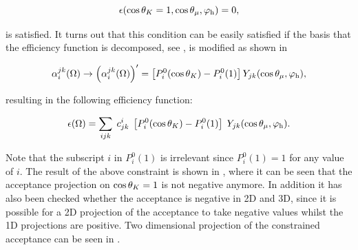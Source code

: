\begin{equation}
  \centering
  \epsilon(\cos\thetaK = 1, \cos\thetamu, \phihel) = 0,
  \label{eff_func_constr}
\end{equation}

\noindent is satisfied. It turns out that this condition can be easily satisfied if the basis that the
efficiency function is decomposed, see , is modified as shown in 

\begin{align}
  \centering
   \effbase \to \parenthesis{\effbase}^\prime = \left[\legendre{i}{0}-P_i^0(1)\right] \spharm{j}{k},
  \label{eff_basis_transform}
  \end{align}

\noindent resulting in the following efficiency function:

\begin{align}
    \centering
  \epsilon(\Omega) = \sum_{ijk} \; \moment{i}{j}{k} \; \left[\legendre{i}{0}-P_i^0(1)\right] \; \spharm{j}{k}.
  \label{eff_func_new}
\end{align}

\noindent Note that the subscript $i$ in $P_i^0(1)$ is irrelevant since $P_i^0(1)=1$ for any value of $i$.
The result of the above constraint is shown in , where it can be seen that
the acceptance projection on $\cos\theta_{K}=1$ is not negative anymore. In addition it has also been checked
whether the acceptance is negative in 2D and 3D, since it is possible for a 2D projection of the acceptance
to take negative values whilst the 1D projections are positive. Two dimensional projection of the constrained
acceptance can be seen in .

